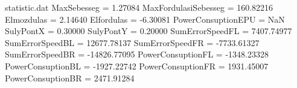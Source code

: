 \begin{filecontents*}{statistic.dat}
MaxSebesseg =    1.27084
MaxFordulasiSebesseg =  160.82216
Elmozdulas =    2.14640
Elfordulas =   -6.30081
PowerConsuptionEPU =        NaN
SulyPontX =    0.30000
SulyPontY =    0.20000
SumErrorSpeedFL = 7407.74977
SumErrorSpeedBL = 12677.78137
SumErrorSpeedFR = -7733.61327
SumErrorSpeedBR = -14826.77095
PowerConsuptionFL = -1348.23328
PowerConsuptionBL = -1927.22742
PowerConsuptionFR = 1931.45007
PowerConsuptionBR = 2471.91284
\end{filecontents*}
